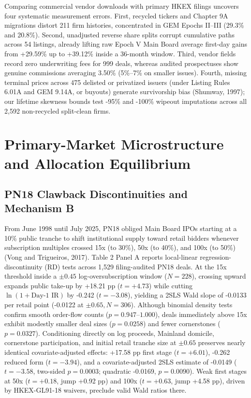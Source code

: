 \documentclass[12pt,letterpaper]{article}
\begin{document}
Comparing commercial vendor downloads with primary HKEX filings uncovers four systematic measurement errors. First, recycled tickers and Chapter 9A migrations distort 211 firm histories, concentrated in GEM Epochs II--III (29.3\% and 20.8\%). Second, unadjusted reverse share splits corrupt cumulative paths across 54 listings, already lifting raw Epoch V Main Board average first-day gains from +29.59\% up to +39.12\% inside a 36-month window. Third, vendor fields record zero underwriting fees for 999 deals, whereas audited prospectuses show genuine commissions averaging 3.50\% (5\%--7\% on smaller issues). Fourth, missing terminal prices across 475 delisted or privatized issuers (under Listing Rules 6.01A and GEM 9.14A, or buyouts) generate survivorship bias (Shumway, 1997); our lifetime skewness bounds test -95\% and -100\% wipeout imputations across all 2,592 non-recycled split-clean firms.

\section{Primary-Market Microstructure and Allocation Equilibrium}

\subsection{PN18 Clawback Discontinuities and Mechanism B}

From June 1998 until July 2025, PN18 obliged Main Board IPOs starting at a 10\% public tranche to shift institutional supply toward retail bidders whenever subscription multiples crossed 15x (to 30\%), 50x (to 40\%), and 100x (to 50\%) (Vong and Trigueiros, 2017). Table 2 Panel A reports local-linear regression-discontinuity (RD) tests across 1,529 filing-audited PN18 deals. At the 15x threshold inside a $\pm 0.45$ log-oversubscription window ($N = 228$), crossing upward expands public take-up by +18.21 pp ($t = +4.73$) while cutting $\ln(1 + \text{Day-1 IR})$ by -0.242 ($t = -3.08$), yielding a 2SLS Wald slope of -0.0133 per retail point (-0.0122 at $\pm 0.65, N = 306$). Although binomial density tests confirm smooth order-flow counts ($p = 0.947\text{--}1.000$), deals immediately above 15x exhibit modestly smaller deal sizes ($p = 0.0258$) and fewer cornerstones ($p = 0.0327$). Conditioning directly on log proceeds, Mainland domicile, cornerstone participation, and initial retail tranche size at $\pm 0.65$ preserves nearly identical covariate-adjusted effects: +17.58 pp first stage ($t = +6.01$), -0.262 reduced form ($t = -3.94$), and a covariate-adjusted 2SLS estimate of -0.0149 ($t = -3.58$, two-sided $p = 0.0003$; quadratic -0.0169, $p = 0.0090$). Weak first stages at 50x ($t = +0.18$, jump +0.92 pp) and 100x ($t = +0.63$, jump +4.58 pp), driven by HKEX-GL91-18 waivers, preclude valid Wald ratios there.
\end{document}
